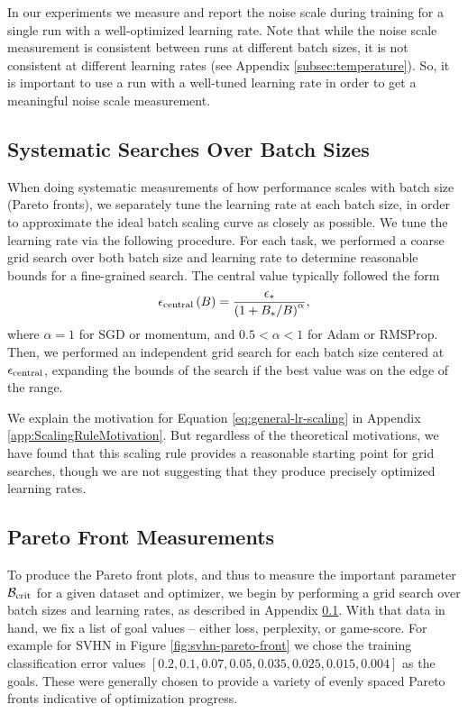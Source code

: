 \documentclass[english]{article}
\newcommand{\CB}{{\cal B}}
\begin{document}
In our experiments we measure and report the noise scale during training for a single run with a well-optimized learning rate.   Note that while the noise scale measurement is consistent between runs at different batch sizes, it is not consistent at different learning rates (see Appendix \ref{subsec:temperature}).  So, it is important to use a run with a well-tuned learning rate in order to get a meaningful noise scale measurement.

\subsection{Systematic Searches Over Batch Sizes}
\label{sec:learning-rate-scaling}

When doing systematic measurements of how performance scales with batch size (Pareto fronts), we  separately tune the learning rate at each batch size, in order to approximate the ideal batch scaling curve as closely as possible.  We tune the learning rate via the following procedure. For each task, we performed a coarse grid search over both batch size and learning rate to determine reasonable bounds for a fine-grained search. The central value typically followed the form
\begin{equation}
\epsilon_{{\rm central}}\left(B\right)=\frac{\epsilon_{\ast}}{\left(1+B_{\ast}/B\right)^{\alpha}},\label{eq:general-lr-scaling}
\end{equation}
where $\alpha=1$ for SGD or momentum, and $0.5<\alpha<1$ for Adam \cite{kingma2014adam} or RMSProp. Then, we performed an independent grid search for each batch size centered at $\epsilon_{{\rm central}}$, expanding the bounds of the search if the best value was on the edge of the range.

We explain the motivation for Equation \ref{eq:general-lr-scaling} in Appendix \ref{app:ScalingRuleMotivation}.  But regardless of the theoretical motivations, we have found that this scaling rule provides a reasonable starting point for grid searches, though we are not suggesting that they produce precisely optimized learning rates.

\subsection{Pareto Front Measurements}

To produce the Pareto front plots, and thus to measure the important parameter $\CB_{\rm crit}$ for a given dataset and optimizer, we begin by performing a grid search over batch sizes and learning rates, as described in Appendix \ref{sec:learning-rate-scaling}.  With that data in hand, we fix a list of goal values -- either loss, perplexity, or game-score.  For example for SVHN in Figure \ref{fig:svhn-pareto-front} we chose the training classification error values $[0.2, 0.1, 0.07, 0.05, 0.035, 0.025, 0.015, 0.004]$ as the goals.  These were generally chosen to provide a variety of evenly spaced Pareto fronts indicative of  optimization progress.
\end{document}
